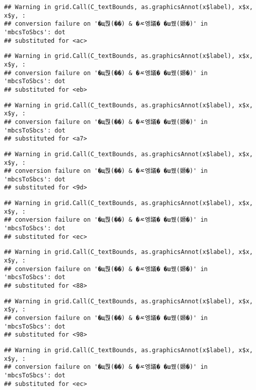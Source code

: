 \documentclass[
]{article}
\begin{document}
\begin{verbatim}
## Warning in grid.Call(C_textBounds, as.graphicsAnnot(x$label), x$x, x$y, :
## conversion failure on '�щ쭩(��) & �ㅼ엥議� �ш퀬(嫄�)' in 'mbcsToSbcs': dot
## substituted for <ac>
\end{verbatim}

\begin{verbatim}
## Warning in grid.Call(C_textBounds, as.graphicsAnnot(x$label), x$x, x$y, :
## conversion failure on '�щ쭩(��) & �ㅼ엥議� �ш퀬(嫄�)' in 'mbcsToSbcs': dot
## substituted for <eb>
\end{verbatim}

\begin{verbatim}
## Warning in grid.Call(C_textBounds, as.graphicsAnnot(x$label), x$x, x$y, :
## conversion failure on '�щ쭩(��) & �ㅼ엥議� �ш퀬(嫄�)' in 'mbcsToSbcs': dot
## substituted for <a7>
\end{verbatim}

\begin{verbatim}
## Warning in grid.Call(C_textBounds, as.graphicsAnnot(x$label), x$x, x$y, :
## conversion failure on '�щ쭩(��) & �ㅼ엥議� �ш퀬(嫄�)' in 'mbcsToSbcs': dot
## substituted for <9d>
\end{verbatim}

\begin{verbatim}
## Warning in grid.Call(C_textBounds, as.graphicsAnnot(x$label), x$x, x$y, :
## conversion failure on '�щ쭩(��) & �ㅼ엥議� �ш퀬(嫄�)' in 'mbcsToSbcs': dot
## substituted for <ec>
\end{verbatim}

\begin{verbatim}
## Warning in grid.Call(C_textBounds, as.graphicsAnnot(x$label), x$x, x$y, :
## conversion failure on '�щ쭩(��) & �ㅼ엥議� �ш퀬(嫄�)' in 'mbcsToSbcs': dot
## substituted for <88>
\end{verbatim}

\begin{verbatim}
## Warning in grid.Call(C_textBounds, as.graphicsAnnot(x$label), x$x, x$y, :
## conversion failure on '�щ쭩(��) & �ㅼ엥議� �ш퀬(嫄�)' in 'mbcsToSbcs': dot
## substituted for <98>
\end{verbatim}

\begin{verbatim}
## Warning in grid.Call(C_textBounds, as.graphicsAnnot(x$label), x$x, x$y, :
## conversion failure on '�щ쭩(��) & �ㅼ엥議� �ш퀬(嫄�)' in 'mbcsToSbcs': dot
## substituted for <ec>
\end{verbatim}
\end{document}
